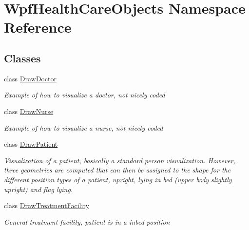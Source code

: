 \hypertarget{namespace_wpf_health_care_objects}{}\section{Wpf\+Health\+Care\+Objects Namespace Reference}
\label{namespace_wpf_health_care_objects}
\subsection*{Classes}
\begin{DoxyCompactItemize}
\item 
class \hyperlink{class_wpf_health_care_objects_1_1_draw_doctor}{Draw\+Doctor}
\begin{DoxyCompactList}\small\item\em Example of how to visualize a doctor, not nicely coded \end{DoxyCompactList}\item 
class \hyperlink{class_wpf_health_care_objects_1_1_draw_nurse}{Draw\+Nurse}
\begin{DoxyCompactList}\small\item\em Example of how to visualize a nurse, not nicely coded \end{DoxyCompactList}\item 
class \hyperlink{class_wpf_health_care_objects_1_1_draw_patient}{Draw\+Patient}
\begin{DoxyCompactList}\small\item\em Visualization of a patient, basically a standard person visualization. However, three geometries are computed that can then be assigned to the shape for the different position types of a patient, upright, lying in bed (upper body slightly upright) and flag lying. \end{DoxyCompactList}\item 
class \hyperlink{class_wpf_health_care_objects_1_1_draw_treatment_facility}{Draw\+Treatment\+Facility}
\begin{DoxyCompactList}\small\item\em General treatment facility, patient is in a inbed position \end{DoxyCompactList}\end{DoxyCompactItemize}
